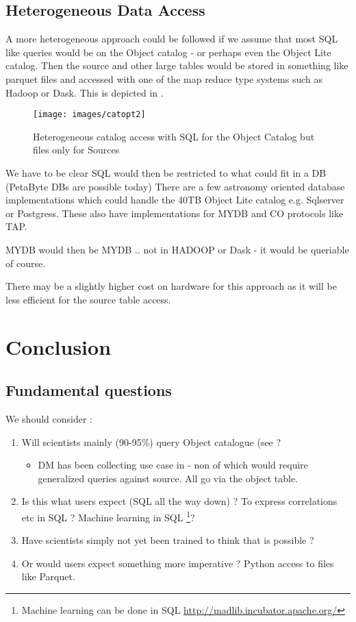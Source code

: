 \subsection{Heterogeneous Data Access }
 A more heterogeneous approach could be followed if we assume that most SQL like queries would be on the Object catalog - or perhaps even the Object Lite catalog.  Then the source and other large tables would be stored in something like parquet files and accessed with one of the map reduce type systems such as Hadoop or Dask. This is depicted in .

\begin{figure}
\begin{center}
 \texttt{[image: images/catopt2]}
\caption{ Heterogeneous catalog access with SQL for the Object Catalog but files only for Sources \label{fig:catopt2}}
\end{center}
\end{figure}

We have to be clear SQL would then be restricted to what could fit in a DB (PetaByte DBs are possible today)
There are a few astronomy oriented database implementations which could handle the 40TB Object Lite catalog e.g. Sqlserver or Postgress. These also have implementations for MYDB and CO protocols like TAP.

MYDB would then be MYDB .. not in HADOOP or Dask - it would be queriable of course.

There may be a slightly higher cost on hardware for this approach as it will be less efficient for the source table access.

\section {Conclusion}
\subsection{Fundamental questions}
We should consider :
\begin{enumerate}
\item Will scientists mainly (90-95\%) query Object catalogue (see ?
	\begin{itemize}
	\item DM has been collecting use case in  - non of which would require generalized queries against source. All go via the object table.
	\end{itemize}
\item  Is this what users expect (SQL all the way down) ? To express correlations etc in SQL ? Machine learning in SQL
\footnote{Machine learning  can be done in SQL \url{http://madlib.incubator.apache.org/}}?

\item Have scientists  simply not yet been trained to think that is possible ?
 \item Or would users expect something more imperative ? Python access to files like Parquet.
\end{enumerate}


